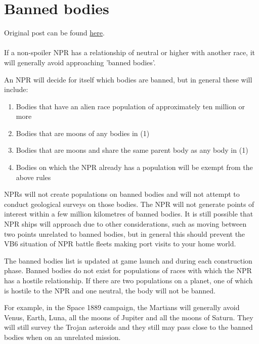\documentclass[../../Aurora C# unofficial manual.tex]{subfiles}
\begin{document}
	\section{Banned bodies}\label{7_banned_bodies}
	Original post can be found
	\href{http://aurora2.pentarch.org/index.php?topic=8495.msg119432#msg119432}{here}.
	\\\\
	
	If a non-spoiler NPR has a relationship of neutral or higher with another race, it will generally avoid approaching 'banned bodies'.
	
	An NPR will decide for itself which bodies are banned, but in general these will include:
	\begin{enumerate}
		\item Bodies that have an alien race population of approximately ten million or more
		\item Bodies that are moons of any bodies in (1)
		\item Bodies that are moons and share the same parent body as any body in (1)
		\item Bodies on which the NPR already has a population will be exempt from the above rules
	\end{enumerate}
	
	NPRs will not create populations on banned bodies and will not attempt to conduct geological surveys on those bodies. The NPR will not generate points of interest within a few million kilometres of banned bodies. It is still possible that NPR ships will approach due to other considerations, such as moving between two points unrelated to banned bodies, but in general this should prevent the VB6 situation of NPR battle fleets making port visits to your home world.
	
	The banned bodies list is updated at game launch and during each construction phase. Banned bodies do not exist for populations of races with which the NPR has a hostile relationship. If there are two populations on a planet, one of which is hostile to the NPR and one neutral, the body will not be banned.
	
	For example, in the Space 1889 campaign, the Martians will generally avoid Venus, Earth, Luna, all the moons of Jupiter and all the moons of Saturn. They will still survey the Trojan asteroids and they still may pass close to the banned bodies when on an unrelated mission.
	
\end{document}
